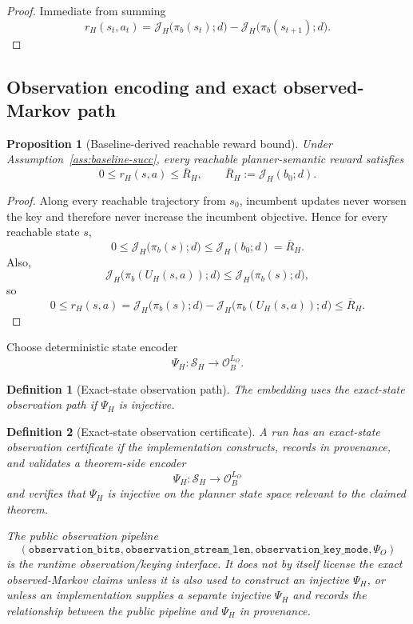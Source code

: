 \documentclass[11pt]{article}
\newtheorem{definition}{Definition}
\newtheorem{proposition}{Proposition}
\begin{document}
\begin{proof}
Immediate from summing
\[
r_H(s_t,a_t)=\mathcal{J}_H\!\bigl(\pi_b(s_t);d\bigr)-\mathcal{J}_H\!\bigl(\pi_b(s_{t+1});d\bigr).
\]
\end{proof}

\subsection{Observation encoding and exact observed-Markov path}

\begin{proposition}[Baseline-derived reachable reward bound]
\label{prop:reward-bound}
Under Assumption~\ref{ass:baseline-succ}, every reachable planner-semantic
reward satisfies
\[
0\le r_H(s,a)\le \overline R_H,
\qquad
\overline R_H:=\mathcal{J}_H(b_0;d).
\]
\end{proposition}

\begin{proof}
Along every reachable trajectory from $s_0$, incumbent updates never worsen the
key and therefore never increase the incumbent objective. Hence for every
reachable state $s$,
\[
0\le \mathcal{J}_H\!\bigl(\pi_b(s);d\bigr)\le \mathcal{J}_H(b_0;d)=\overline R_H.
\]
Also,
\[
\mathcal{J}_H\!\bigl(\pi_b(U_H(s,a));d\bigr)
\le
\mathcal{J}_H\!\bigl(\pi_b(s);d\bigr),
\]
so
\[
0
\le
r_H(s,a)
=
\mathcal{J}_H\!\bigl(\pi_b(s);d\bigr)-\mathcal{J}_H\!\bigl(\pi_b(U_H(s,a));d\bigr)
\le
\overline R_H.
\]
\end{proof}

Choose deterministic state encoder
\[
\Psi_H:\mathcal{S}_H\to\mathcal{O}_B^{L_O}.
\]

\begin{definition}[Exact-state observation path]
The embedding uses the \emph{exact-state observation path} if $\Psi_H$ is
injective.
\end{definition}

\begin{definition}[Exact-state observation certificate]
A run has an \emph{exact-state observation certificate} if the implementation
constructs, records in provenance, and validates a theorem-side encoder
\[
\Psi_H:\mathcal{S}_H\to\mathcal{O}_B^{L_O}
\]
and verifies that $\Psi_H$ is injective on the planner state space relevant to
the claimed theorem.

The public observation pipeline
\[
(\texttt{observation\_bits},
\texttt{observation\_stream\_len},
\texttt{observation\_key\_mode},
\Psi_O)
\]
is the runtime observation/keying interface. It does not by itself license the
exact observed-Markov claims unless it is also used to construct an injective
$\Psi_H$, or unless an implementation supplies a separate injective $\Psi_H$
and records the relationship between the public pipeline and $\Psi_H$ in
provenance.
\end{definition}
\end{document}
